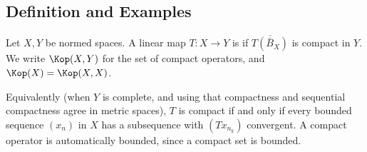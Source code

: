 \subsection{Definition and Examples}

\begin{definition}
	Let $X, Y$ be normed spaces. A linear map $T : X \to Y$ is  if $\overline{T(\bar B_X)}$ is compact in $Y$. We write $\Kop(X,Y)$ for the set of compact operators, and $\Kop(X)=\Kop(X,X)$.
\end{definition}

Equivalently (when $Y$ is complete, and using that compactness and sequential compactness agree in metric spaces), $T$ is compact if and only if every bounded sequence $(x_n)$ in $X$ has a subsequence with $(Tx_{n_k})$ convergent. A compact operator is automatically bounded, since a compact set is bounded.

\begin{center}
\end{center}

